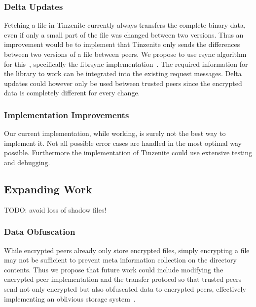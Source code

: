 \subsubsection{Delta Updates}
\label{subs:Delta Updates}

Fetching a file in Tinzenite currently always transfers the complete binary data, even if only a small part of the file was changed between two versions.
Thus an improvement would be to implement that Tinzenite only sends the differences between two versions of a file between peers.
We propose to use rsync algorithm for this~\cite{tridgell1996rsync}, specifically the librsync implementation~\cite{web:site:librsync}.
The required information for the library to work can be integrated into the existing request messages.
Delta updates could however only be used between trusted peers since the encrypted data is completely different for every change.

\subsubsection{Implementation Improvements}
\label{subs:Implementation Improvements}

Our current implementation, while working, is surely not the best way to implement it.
Not all possible error cases are handled in the most optimal way possible.
Furthermore the implementation of Tinzenite could use extensive testing and debugging.

\subsection{Expanding Work}
\label{sub:Expanding Work}

TODO: avoid loss of shadow files!

\subsubsection{Data Obfuscation}
\label{subs:Data Obfuscation}

While encrypted peers already only store encrypted files, simply encrypting a file may not be sufficient to prevent meta information collection on the directory contents.
Thus we propose that future work could include modifying the encrypted peer implementation and the transfer protocol so that trusted peers send not only encrypted but also obfuscated data to encrypted peers, effectively implementing an oblivious storage system~\cite{goldreich1996software}.

